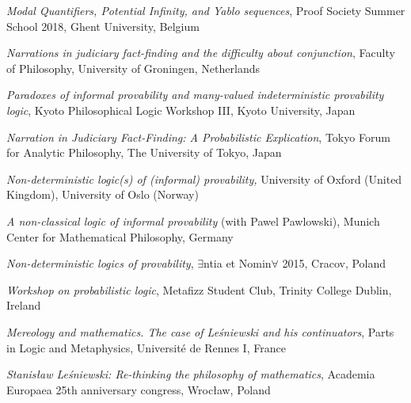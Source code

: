 \documentclass[10pt, a4paper]{article}
\newcommand{\years}[1]{\marginnote{\normalsize #1}}
\begin{document}
\emph{Modal Quantifiers, Potential Infinity, and Yablo sequences}, Proof Society Summer School 2018, Ghent University, Belgium

\vspace{0.5mm}

\years{2017} \emph{Narrations in judiciary fact-finding
and the difficulty about conjunction}, Faculty of Philosophy, University of Groningen, Netherlands

\vspace{0.5mm}

\emph{Paradoxes of informal provability and many-valued indeterministic provability logic}, Kyoto Philosophical Logic Workshop III, Kyoto University, Japan

\vspace{0.5mm}


\emph{Narration in Judiciary Fact-Finding: A Probabilistic Explication}, Tokyo Forum for Analytic Philosophy, The University of Tokyo, Japan


\vspace{0.5mm}


\years{2015}  \emph{Non-deterministic logic(s) of (informal) provability,}  University of Oxford (United Kingdom), University of Oslo (Norway)


\vspace{0.5mm}


 \emph{A non-classical logic of informal provability} (with Pawel Pawlowski), Munich Center for Mathematical Philosophy, Germany


\vspace{0.5mm}


\emph{Non-deterministic logics of provability}, $\exists$ntia et Nomin$\forall$ 2015, Cracov, Poland


\vspace{0.5mm}


  \emph{Workshop on  probabilistic logic}, Metafizz Student Club,
Trinity College Dublin, Ireland


\vspace{0.5mm}



\years{2013} \emph{Mereology and mathematics. The case of Le\'sniewski and his continuators}, Parts in Logic and Metaphysics, Universit{\'e} de Rennes I, France


\vspace{0.5mm}


\emph{Stanis\l aw Le\' sniewski: Re-thinking the philosophy of mathematics}, Academia Europaea 25th anniversary congress, Wroc\l aw, Poland
\end{document}
